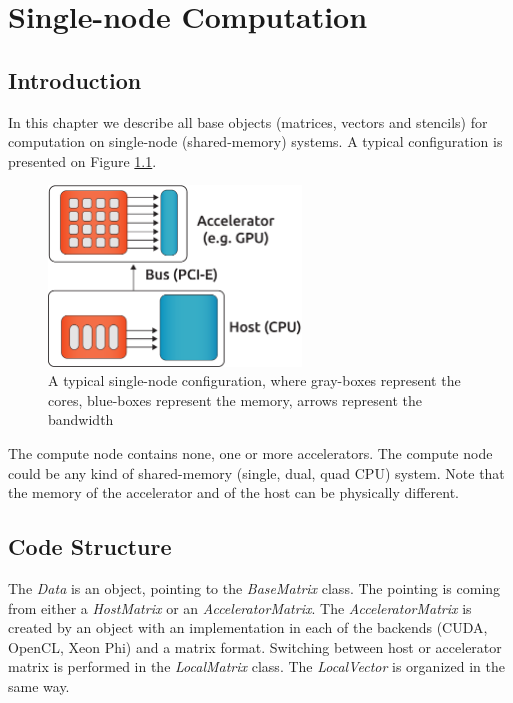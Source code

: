 \chapter{Single-node Computation}

\section{Introduction}

In this chapter we describe all base objects (matrices, vectors and stencils) for computation on single-node (shared-memory) systems. A typical configuration is presented on Figure \ref{single-node}.

\begin{figure}[!ht]
\centering
\includegraphics[width=0.6\textwidth]{./fig/single-node.pdf}
\caption{A typical single-node configuration, where gray-boxes represent the cores, blue-boxes represent the memory, arrows represent the bandwidth}
\label{single-node}
\end{figure}

The compute node contains none, one or more accelerators. The compute node could be any kind of shared-memory (single, dual, quad CPU) system. Note that the memory of the accelerator and of the host can be physically different.

\section{Code Structure}

The \emph{Data} is an object, pointing to the \emph{BaseMatrix} class. The pointing is coming from either a \emph{HostMatrix} or an \emph{AcceleratorMatrix}. The \emph{AcceleratorMatrix} is created by an object with an implementation in each of the backends (CUDA, OpenCL, Xeon Phi) and a matrix format. Switching between host or accelerator matrix is performed in the \emph{LocalMatrix} class. The \emph{LocalVector} is organized in the same way.

